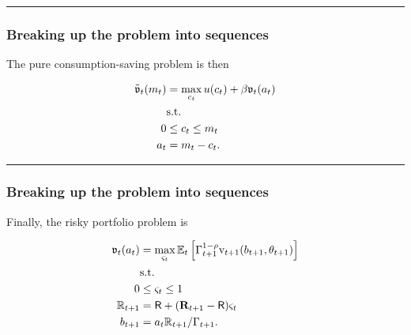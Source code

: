 \documentclass[
  letterpaper,
  DIV=11,
  numbers=noendperiod]{scrartcl}
\begin{document}
\begin{center}\rule{0.5\linewidth}{0.5pt}\end{center}

\hypertarget{breaking-up-the-problem-into-sequences-1}{%
\subsubsection{Breaking up the problem into
sequences}\label{breaking-up-the-problem-into-sequences-1}}

The pure consumption-saving problem is then

\[\begin{equation}
\begin{split}
    \tilde{\mathfrak{v}}_{t}(m_{t}) & = \max_{c_{t}} u(c_{t}) + \beta\mathfrak{v}_{t}(a_{t}) \\
    & \text{s.t.} \\
    0 & \leq c_{t} \leq m_{t} \\
    a_{t} & = m_{t} - c_{t}.
  \end{split}
\end{equation}\]

\begin{center}\rule{0.5\linewidth}{0.5pt}\end{center}

\hypertarget{breaking-up-the-problem-into-sequences-2}{%
\subsubsection{Breaking up the problem into
sequences}\label{breaking-up-the-problem-into-sequences-2}}

Finally, the risky portfolio problem is

\[\begin{equation}
\begin{split}
    \mathfrak{v}_{t}(a_{t}) & = \max_{\varsigma_{t}}
    \mathbb{E}_{t} \left[ \Gamma_{t+1}^{1-\rho}
      \mathrm{v}_{t+1}(b_{t+1},
      \theta_{t+1}) \right] \\
    & \text{s.t.} \\
    0 & \leq \varsigma_{t} \leq 1 \\
    \mathbb{R}_{t+1} & = \mathsf{R} + (\mathbf{R}_{t+1} - \mathsf{R})
    \varsigma_{t} \\
    b_{t+1} & = a_{t} \mathbb{R}_{t+1} / \Gamma_{t+1}.
  \end{split}
\end{equation}\]
\end{document}
